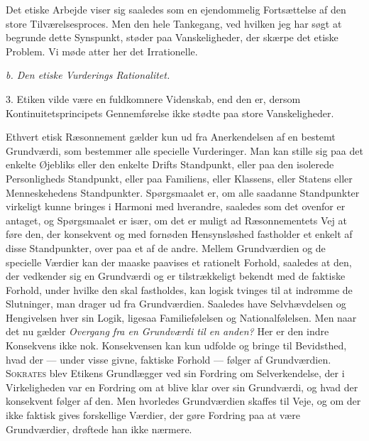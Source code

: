 \documentclass[12pt,a4paper,openany]{book}
\newcommand{\opage}[1]{\marginnote{\footnotesize\textit{[#1]}}}
\begin{document}
\opage{75}Det etiske Arbejde viser sig saaledes som en ejendommelig
Fortsættelse af den store Tilværelsesproces. Men den hele Tankegang, ved
hvilken jeg har søgt at begrunde dette Synspunkt, støder paa Vanskeligheder,
der skærpe det etiske Problem. Vi møde atter her det Irrationelle.

\begin{center}\textit{b. Den etiske Vurderings Rationalitet.}\end{center}

3. Etiken vilde være en fuldkomnere Videnskab, end den er, dersom
Kontinuitetsprincipets Gennemførelse ikke stødte paa store Vanskeligheder.

Ethvert etisk Ræsonnement gælder kun ud fra Anerkendelsen af en bestemt
Grundværdi, som bestemmer alle specielle Vurderinger. Man kan stille sig paa
det enkelte Øjebliks eller den enkelte Drifts Standpunkt, eller paa den
isolerede Personligheds Standpunkt, eller paa Familiens, eller Klassens, eller
Statens eller Menneskehedens Standpunkter. Spørgsmaalet er, om alle saadanne
Standpunkter virkeligt kunne bringes i Harmoni med hverandre, saaledes som det
ovenfor er antaget, og Spørgsmaalet er især, om det er muligt ad Ræsonnementets
Vej at føre den, der konsekvent og med fornøden Hensynsløshed fastholder et
enkelt af disse Standpunkter, over paa et af de andre. Mellem Grundværdien og
de specielle Værdier kan der maaske paavises et rationelt Forhold, saaledes at
den, der vedkender sig en Grundværdi og er tilstrækkeligt bekendt med de
faktiske Forhold, under hvilke den skal fastholdes, kan logisk tvinges til at
indrømme de Slutninger, man drager ud fra Grundværdien. Saaledes have
Selvhævdelsen og Hengivelsen hver sin Logik, ligesaa Familiefølelsen og
Nationalfølelsen. Men naar det nu gælder \textit{Overgang fra en Grundværdi til
en anden?} Her er den indre Konsekvens ikke nok. Konsekvensen kan kun udfolde
og bringe til Bevidsthed, hvad der --- under visse givne, faktiske Forhold ---
følger af Grundværdien. \textsc{Sokrates} blev Etikens Grundlægger ved sin
Fordring om Selverkendelse, der i Virkeligheden var en Fordring om at blive
klar over sin Grundværdi, og hvad der konsekvent følger af den. Men hvorledes
Grundværdien skaffes til Veje, og om der ikke faktisk
\opage{76}gives forskellige Værdier, der gøre Fordring paa at være
Grundværdier, drøftede han ikke nærmere.
\end{document}
